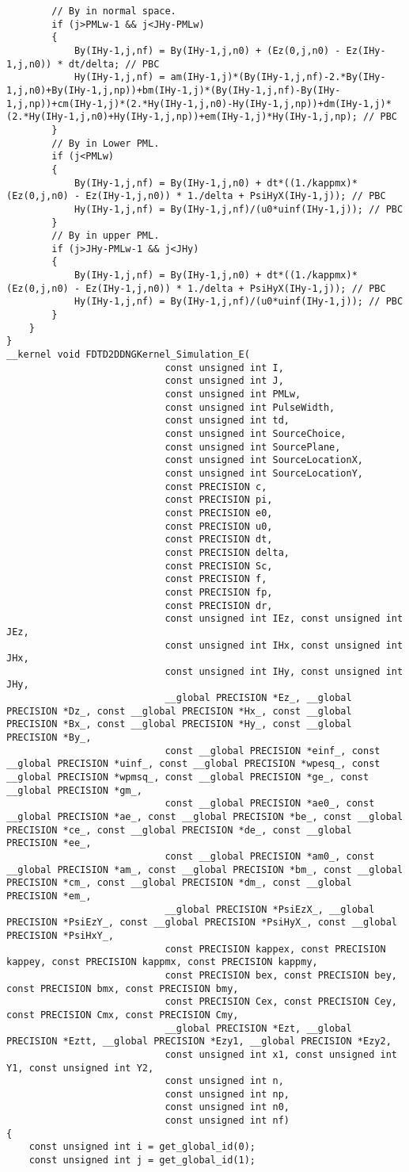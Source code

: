 \begin{lstlisting}
		// By in normal space.
		if (j>PMLw-1 && j<JHy-PMLw)
		{
			By(IHy-1,j,nf) = By(IHy-1,j,n0) + (Ez(0,j,n0) - Ez(IHy-1,j,n0)) * dt/delta; // PBC
			Hy(IHy-1,j,nf) = am(IHy-1,j)*(By(IHy-1,j,nf)-2.*By(IHy-1,j,n0)+By(IHy-1,j,np))+bm(IHy-1,j)*(By(IHy-1,j,nf)-By(IHy-1,j,np))+cm(IHy-1,j)*(2.*Hy(IHy-1,j,n0)-Hy(IHy-1,j,np))+dm(IHy-1,j)*(2.*Hy(IHy-1,j,n0)+Hy(IHy-1,j,np))+em(IHy-1,j)*Hy(IHy-1,j,np); // PBC
		}
		// By in Lower PML.
		if (j<PMLw)
		{
			By(IHy-1,j,nf) = By(IHy-1,j,n0) + dt*((1./kappmx)*(Ez(0,j,n0) - Ez(IHy-1,j,n0)) * 1./delta + PsiHyX(IHy-1,j)); // PBC
			Hy(IHy-1,j,nf) = By(IHy-1,j,nf)/(u0*uinf(IHy-1,j)); // PBC
		}
		// By in upper PML.
		if (j>JHy-PMLw-1 && j<JHy)
		{
			By(IHy-1,j,nf) = By(IHy-1,j,n0) + dt*((1./kappmx)*(Ez(0,j,n0) - Ez(IHy-1,j,n0)) * 1./delta + PsiHyX(IHy-1,j)); // PBC
			Hy(IHy-1,j,nf) = By(IHy-1,j,nf)/(u0*uinf(IHy-1,j)); // PBC
		}
	}
}
__kernel void FDTD2DDNGKernel_Simulation_E(
							const unsigned int I,
							const unsigned int J,
							const unsigned int PMLw,
							const unsigned int PulseWidth,
							const unsigned int td,
							const unsigned int SourceChoice,
							const unsigned int SourcePlane,
							const unsigned int SourceLocationX,
							const unsigned int SourceLocationY,
							const PRECISION c,
							const PRECISION pi,
							const PRECISION e0,
							const PRECISION u0,
							const PRECISION dt,
							const PRECISION delta,
							const PRECISION Sc,
							const PRECISION f,
							const PRECISION fp,
							const PRECISION dr,
							const unsigned int IEz, const unsigned int JEz,
							const unsigned int IHx, const unsigned int JHx,
							const unsigned int IHy, const unsigned int JHy,
							__global PRECISION *Ez_, __global PRECISION *Dz_, const __global PRECISION *Hx_, const __global PRECISION *Bx_, const __global PRECISION *Hy_, const __global PRECISION *By_,
							const __global PRECISION *einf_, const __global PRECISION *uinf_, const __global PRECISION *wpesq_, const __global PRECISION *wpmsq_, const __global PRECISION *ge_, const __global PRECISION *gm_,
							const __global PRECISION *ae0_, const __global PRECISION *ae_, const __global PRECISION *be_, const __global PRECISION *ce_, const __global PRECISION *de_, const __global PRECISION *ee_,
							const __global PRECISION *am0_, const __global PRECISION *am_, const __global PRECISION *bm_, const __global PRECISION *cm_, const __global PRECISION *dm_, const __global PRECISION *em_,
							__global PRECISION *PsiEzX_, __global PRECISION *PsiEzY_, const __global PRECISION *PsiHyX_, const __global PRECISION *PsiHxY_,
							const PRECISION kappex, const PRECISION kappey, const PRECISION kappmx, const PRECISION kappmy,
							const PRECISION bex, const PRECISION bey, const PRECISION bmx, const PRECISION bmy,
							const PRECISION Cex, const PRECISION Cey, const PRECISION Cmx, const PRECISION Cmy,
							__global PRECISION *Ezt, __global PRECISION *Eztt, __global PRECISION *Ezy1, __global PRECISION *Ezy2,
							const unsigned int x1, const unsigned int Y1, const unsigned int Y2,
							const unsigned int n,
							const unsigned int np,
							const unsigned int n0,
							const unsigned int nf)
{
	const unsigned int i = get_global_id(0);
	const unsigned int j = get_global_id(1);


\end{lstlisting}
